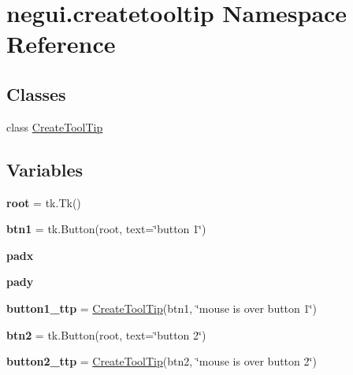 \hypertarget{namespacenegui_1_1createtooltip}{}\section{negui.\+createtooltip Namespace Reference}
\label{namespacenegui_1_1createtooltip}
\subsection*{Classes}
\begin{DoxyCompactItemize}
\item 
class \hyperlink{classnegui_1_1createtooltip_1_1CreateToolTip}{Create\+Tool\+Tip}
\end{DoxyCompactItemize}
\subsection*{Variables}
\begin{DoxyCompactItemize}
\item 
{\bfseries root} = tk.\+Tk()\hypertarget{namespacenegui_1_1createtooltip_aa688e3f6b2b59bda1755106900286212}{}\label{namespacenegui_1_1createtooltip_aa688e3f6b2b59bda1755106900286212}

\item 
{\bfseries btn1} = tk.\+Button(root, text=\char`\"{}button 1\char`\"{})\hypertarget{namespacenegui_1_1createtooltip_aa113745f2ab72a5e75ab2bb01cff3356}{}\label{namespacenegui_1_1createtooltip_aa113745f2ab72a5e75ab2bb01cff3356}

\item 
{\bfseries padx}\hypertarget{namespacenegui_1_1createtooltip_a3e804f457c40136bad905e27d85a88a2}{}\label{namespacenegui_1_1createtooltip_a3e804f457c40136bad905e27d85a88a2}

\item 
{\bfseries pady}\hypertarget{namespacenegui_1_1createtooltip_a8eed40e20ac034905e0d509f5492061d}{}\label{namespacenegui_1_1createtooltip_a8eed40e20ac034905e0d509f5492061d}

\item 
{\bfseries button1\+\_\+ttp} = \hyperlink{classnegui_1_1createtooltip_1_1CreateToolTip}{Create\+Tool\+Tip}(btn1, \char`\"{}mouse is over button 1\char`\"{})\hypertarget{namespacenegui_1_1createtooltip_a1262ce17485b05f89c415a9a21aa4b39}{}\label{namespacenegui_1_1createtooltip_a1262ce17485b05f89c415a9a21aa4b39}

\item 
{\bfseries btn2} = tk.\+Button(root, text=\char`\"{}button 2\char`\"{})\hypertarget{namespacenegui_1_1createtooltip_ae134226f2040178666432bcad1ca0a58}{}\label{namespacenegui_1_1createtooltip_ae134226f2040178666432bcad1ca0a58}

\item 
{\bfseries button2\+\_\+ttp} = \hyperlink{classnegui_1_1createtooltip_1_1CreateToolTip}{Create\+Tool\+Tip}(btn2, \char`\"{}mouse is over button 2\char`\"{})\hypertarget{namespacenegui_1_1createtooltip_a4bcc9c17908190cce6b43ad8d0d8a2b1}{}\label{namespacenegui_1_1createtooltip_a4bcc9c17908190cce6b43ad8d0d8a2b1}

\end{DoxyCompactItemize}


